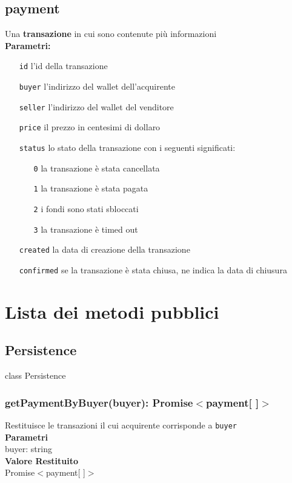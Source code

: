 \documentclass[a4paper, 12pt]{article}
\begin{document}
\subsection{payment}
Una \textbf{transazione} in cui sono contenute più informazioni\\
\textbf{Parametri:}
\begin{itemize}
\item[\texttt{id}] l'id della transazione
\item[\texttt{buyer}] l'indirizzo del wallet dell'acquirente
\item[\texttt{seller}] l'indirizzo del wallet del venditore
\item[\texttt{price}] il prezzo in centesimi di dollaro
\item[\texttt{status}] lo stato della transazione con i seguenti significati:
	\begin{itemize}
	\item[\texttt{0}] la transazione è stata cancellata
	\item[\texttt{1}] la transazione è stata pagata
	\item[\texttt{2}] i fondi sono stati sbloccati
	\item[\texttt{3}] la transazione è timed out
	\end{itemize}
\item[\texttt{created}] la data di creazione della transazione
\item[\texttt{confirmed}] se la transazione è stata chiusa, ne indica la data di chiusura
\end{itemize}

\section{Lista dei metodi pubblici}
\subsection{Persistence}
class Persistence

\subsubsection{getPaymentByBuyer(buyer): Promise$<$payment[ ]$>$}
Restituisce le transazioni il cui acquirente corrisponde a \texttt{buyer}\\
\textbf{Parametri}\\
buyer: string\\
\textbf{Valore Restituito}\\
Promise$<$payment[ ]$>$
\end{document}
